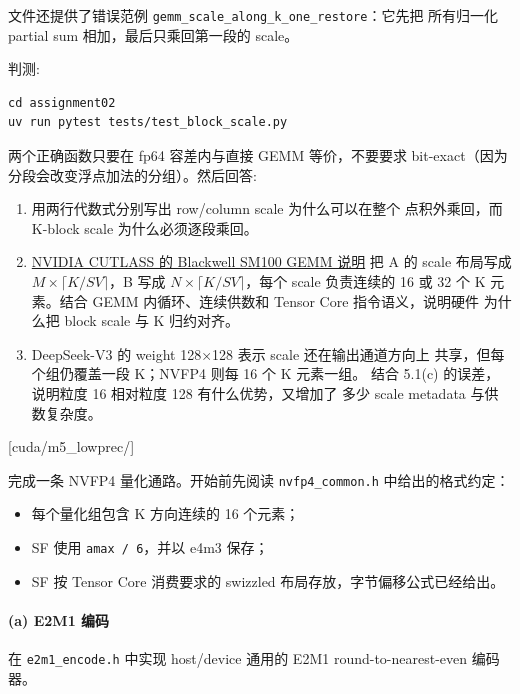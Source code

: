 \documentclass[11pt,a4paper,fontset=fandol]{ctexart}
\providecommand{\tightlist}{\setlength{\itemsep}{0pt}\setlength{\parskip}{0pt}}
\begin{document}
文件还提供了错误范例
\texttt{gemm\_scale\_along\_k\_one\_restore}：它先把 所有归一化 partial
sum 相加，最后只乘回第一段的 scale。

判测:

\begin{verbatim}
cd assignment02
uv run pytest tests/test_block_scale.py
\end{verbatim}

两个正确函数只要在 fp64 容差内与直接 GEMM 等价，不要要求
bit-exact（因为分段会改变浮点加法的分组）。然后回答:

\begin{enumerate}
\def\labelenumi{(\alph{enumi})}
\item
  用两行代数式分别写出 row/column scale 为什么可以在整个 点积外乘回，而
  K-block scale 为什么必须逐段乘回。
\item
  \href{https://docs.nvidia.com/cutlass/latest/media/docs/cpp/blackwell_functionality.html}{NVIDIA
  CUTLASS 的 Blackwell SM100 GEMM 说明} 把 A 的 scale 布局写成
  \(M \times \lceil K/SV \rceil\)，B 写成
  \(N \times \lceil K/SV \rceil\)，每个 scale 负责连续的 16 或 32 个 K
  元素。结合 GEMM 内循环、连续供数和 Tensor Core 指令语义，说明硬件
  为什么把 block scale 与 K 归约对齐。
\item
  DeepSeek-V3 的 weight 128×128 表示 scale 还在输出通道方向上
  共享，但每个组仍覆盖一段 K；NVFP4 则每 16 个 K 元素一组。 结合 5.1(c)
  的误差，说明粒度 16 相对粒度 128 有什么优势，又增加了 多少 scale
  metadata 与供数复杂度。
\end{enumerate}

[cuda/m5\_lowprec/]

完成一条 NVFP4 量化通路。开始前先阅读 \texttt{nvfp4\_common.h}
中给出的格式约定：

\begin{itemize}
\tightlist
\item
  每个量化组包含 K 方向连续的 16 个元素；
\item
  SF 使用 \texttt{amax\ /\ 6}，并以 e4m3 保存；
\item
  SF 按 Tensor Core 消费要求的 swizzled 布局存放，字节偏移公式已经给出。
\end{itemize}

\paragraph{(a) E2M1 编码}\label{a-e2m1-ux7f16ux7801}

在 \texttt{e2m1\_encode.h} 中实现 host/device 通用的 E2M1
round-to-nearest-even 编码器。
\end{document}
